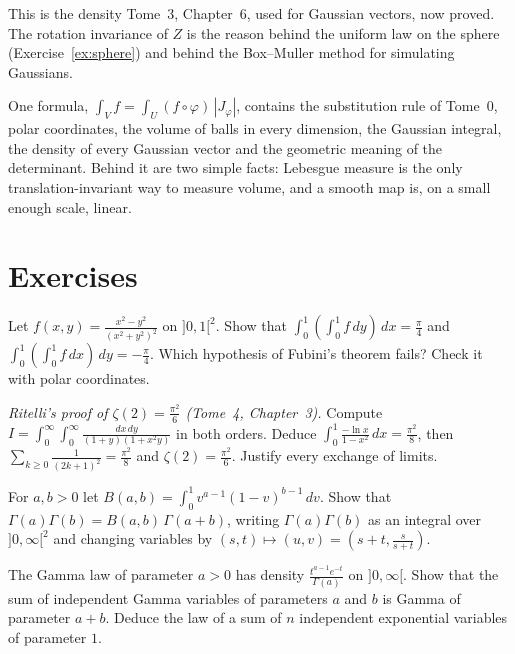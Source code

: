 This is the density Tome~3, Chapter~6, used for Gaussian vectors, now proved. The rotation invariance of $Z$ is the reason behind the uniform law on the sphere (Exercise~\ref{ex:sphere}) and behind
the Box--Muller method for simulating Gaussians.

\begin{beauty}
One formula, $\int_Vf=\int_U(f\circ\varphi)\,|J_\varphi|$, contains the substitution rule of Tome~0, polar coordinates, the volume of balls in every dimension, the Gaussian integral, the density of every
Gaussian vector and the geometric meaning of the determinant. Behind it are two simple facts: Lebesgue measure is the only translation-invariant way to measure volume, and a smooth map is, on a
small enough scale, linear.
\end{beauty}

\section{Exercises}

\begin{exercise}[$\star$]\label{ex:fubinifail}
Let $f(x,y)=\frac{x^2-y^2}{(x^2+y^2)^2}$ on $]0,1[^2$. Show that $\int_0^1(\int_0^1f\,dy)\,dx=\frac\pi4$ and $\int_0^1(\int_0^1f\,dx)\,dy=-\frac\pi4$. Which hypothesis of Fubini's theorem fails? Check it with polar
coordinates.
\end{exercise}

\begin{exercise}[$\star\star$]\label{ex:basel}
\emph{Ritelli's proof of $\zeta(2)=\frac{\pi^2}6$ (Tome~4, Chapter~3).} Compute $I=\int_0^\infty\!\int_0^\infty\frac{dx\,dy}{(1+y)(1+x^2y)}$ in both orders. Deduce $\int_0^1\frac{-\ln x}{1-x^2}\,dx=\frac{\pi^2}8$, then
$\sum_{k\ge0}\frac1{(2k+1)^2}=\frac{\pi^2}8$ and $\zeta(2)=\frac{\pi^2}6$. Justify every exchange of limits.
\end{exercise}

\begin{exercise}[$\star\star$]\label{ex:betagamma}
For $a,b>0$ let $B(a,b)=\int_0^1v^{a-1}(1-v)^{b-1}\,dv$. Show that $\Gamma(a)\Gamma(b)=B(a,b)\,\Gamma(a+b)$, writing $\Gamma(a)\Gamma(b)$ as an integral over $]0,\infty[^2$ and changing variables by
$(s,t)\mapsto(u,v)=(s+t,\frac s{s+t})$.
\end{exercise}

\begin{exercise}[$\star$]\label{ex:gammasum}
The Gamma law of parameter $a>0$ has density $\frac{t^{a-1}e^{-t}}{\Gamma(a)}$ on $]0,\infty[$. Show that the sum of independent Gamma variables of parameters $a$ and $b$ is Gamma of parameter $a+b$. Deduce
the law of a sum of $n$ independent exponential variables of parameter $1$.
\end{exercise}

